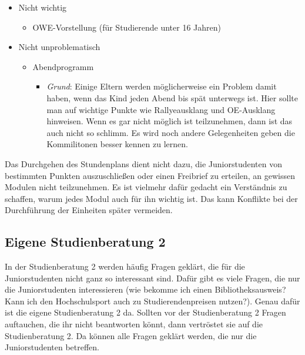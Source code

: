 \documentclass[a4paper,11pt]{scrartcl} %
\newenvironment{myitemize}{\begin{itemize}\itemsep -2pt}{\end{itemize}} %
\begin{document}
\begin{myitemize}
\begin{myitemize}
			\item Studienberatung 3 - kann aber durchaus als Überbrückung bis zum Ausklang am Freitag genutzt werden
		\end{myitemize}
	\newpage
	\item Nicht wichtig
		\begin{myitemize}
			\item OWE-Vorstellung (für Studierende unter 16 Jahren)
		\end{myitemize}
	\item Nicht unproblematisch
		\begin{myitemize}
			\item Abendprogramm
				\begin{myitemize}
					\item \textit{Grund}: Einige Eltern werden möglicherweise ein Problem damit haben, wenn das Kind jeden Abend bis spät unterwegs ist. Hier sollte man auf wichtige Punkte wie Rallyeausklang und OE-Ausklang hinweisen. Wenn es gar nicht möglich ist teilzunehmen, dann ist das auch nicht so schlimm. Es wird noch andere Gelegenheiten geben die Kommilitonen besser kennen zu lernen.
				\end{myitemize}
		\end{myitemize}		
\end{myitemize}

Das Durchgehen des Stundenplans dient nicht dazu, die Juniorstudenten von bestimmten Punkten auszuschließen oder einen Freibrief zu erteilen, an gewissen Modulen nicht teilzunehmen. Es ist vielmehr dafür gedacht ein Verständnis zu schaffen, warum jedes Modul auch für ihn wichtig ist. Das kann Konflikte bei der Durchführung der Einheiten später vermeiden.

	\subsection{Eigene Studienberatung 2}
	
In der Studienberatung 2 werden häufig Fragen geklärt, die für die Juniorstudenten nicht ganz so interessant sind. Dafür gibt es viele Fragen, die nur die Juniorstudenten interessieren (wie bekomme ich einen Bibliotheksausweis? Kann ich den Hochschulsport auch zu Studierendenpreisen nutzen?). Genau dafür ist die eigene Studienberatung 2 da. Sollten vor der Studienberatung 2 Fragen auftauchen, die ihr nicht beantworten könnt, dann vertröstet sie auf die Studienberatung 2. Da können alle Fragen geklärt werden, die nur die Juniorstudenten betreffen.	
\end{document}
